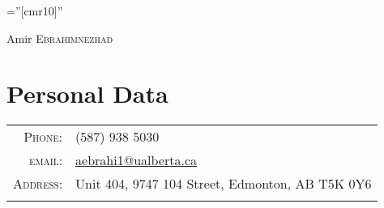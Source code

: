 \documentclass[a4paper,10pt]{article}
\begin{document}

\pagestyle{empty} %

\font\fb=''[cmr10]'' %

\par{\centering
		{\Huge Amir \textsc{Ebrahimnezhad}
	}\bigskip\par}

\section{Personal Data}

\begin{tabular}{rl}

    \textsc{Phone:}     & (587) 938 5030 \\
    \textsc{email:}     & \href{aebrahi1@ualberta.ca}{aebrahi1@ualberta.ca}\\
    \textsc{Address:}     & Unit 404, 9747 104 Street, Edmonton, AB T5K 0Y6 \\
{}
\end{tabular}




\end{document}
